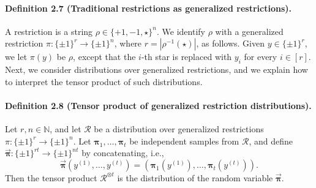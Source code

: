 \paragraph{Definition 2.7 (Traditional restrictions as generalized restrictions).} A restriction is a string $\rho\in\{+1,-1,\star\}^n$. We identify $\rho$ with a generalized restriction $\pi:\{\pm1\}^r\to\{\pm1\}^n$, where $r=|\rho^{-1}(\star)|$, as follows. Given $y\in\{\pm1\}^r$, we let $\pi(y)$ be $\rho$, except that the $i$-th star is replaced with $y_i$ for every $i\in[r]$.
Next, we consider distributions over generalized restrictions, and we explain how to interpret the tensor product of such distributions.
\paragraph{Definition 2.8 (Tensor product of generalized restriction distributions).} Let $r,n\in\mathbb N$, and let $\mathcal R$ be a distribution over generalized restrictions $\pi:\{\pm1\}^r\to\{\pm1\}^n$. Let $\boldsymbol\pi_1,\ldots,\boldsymbol\pi_t$ be independent samples from $\mathcal R$, and define $\vec{\boldsymbol\pi}:\{\pm1\}^{rt}\to\{\pm1\}^{nt}$ by concatenating, i.e.,
\[\vec{\boldsymbol\pi}(y^{(1)},\ldots,y^{(t)})=(\boldsymbol\pi_1(y^{(1)}),\ldots,\boldsymbol\pi_t(y^{(t)})).\]
Then the tensor product $\mathcal R^{\otimes t}$ is the distribution of the random variable $\vec{\boldsymbol\pi}$.
